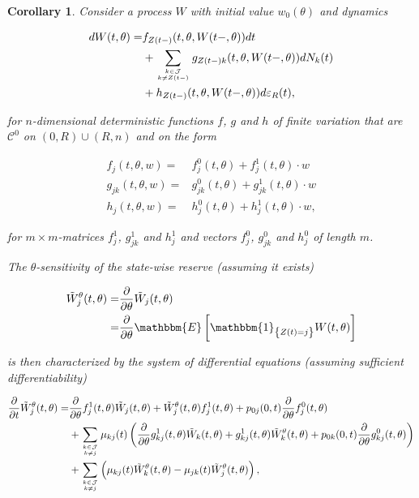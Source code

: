\documentclass{article}
\newcommand{\1}[1]{\mathbbm{1}_{\left\lbrace #1 \right\rbrace}}
\newcommand{\expec}[1][def]{\mathbbm{E} \left[ #1 \right]}
\theoremstyle{break}
\newtheorem{corollary}[definition]{Corollary}
\theoremstyle{remark}
\numberwithin{equation}{section}
\begin{document}
\begin{corollary} \label{Corollary}
	Consider a process $W$ with initial value $w_0(\theta)$ and dynamics
	
	\begin{align*}
		dW(t,\theta) =& f_{Z(t-)}(t,\theta,W(t-,\theta)) dt \\
		&+ \sum_{k \in \mathcal{J} \atop k \neq Z(t-)} g_{Z(t-)k}(t,\theta,W(t-,\theta)) dN_{k}(t) \\
		&+ h_{Z(t-)}(t,\theta,W(t-,\theta)) d \varepsilon_R(t),
	\end{align*}

	for $n$-dimensional deterministic functions $f$, $g$ and $h$ of finite variation that are $\mathcal{C}^0$ on $(0,R) \cup (R,n)$ and on the form
	
	\begin{align*}
		f_j(t,\theta,w) =& f_j^0(t,\theta) + f_j^1(t,\theta) \cdot w \\
		g_{jk}(t,\theta,w) =& g_{jk}^0(t,\theta) + g_{jk}^1(t,\theta) \cdot w \\
		h_j(t,\theta,w) =& h_j^0(t,\theta) + h_j^1(t,\theta) \cdot w,
	\end{align*}
	
	for $m \times m$-matrices $f_j^1$, $g_{jk}^1$ and $ h_j^1$ and vectors $f_j^0$, $g_{jk}^0$ and $ h_j^0$ of length $m$.

	The $\theta$-sensitivity of the state-wise reserve (assuming it exists)
	
	\begin{align*}
		\tilde{W}_j^\theta(t,\theta) =& \frac{\partial}{\partial \theta} \tilde{W}_j(t,\theta) \\
		=& \frac{\partial}{\partial \theta} \expec[\1{Z(t)=j} W(t,\theta)]
	\end{align*}
	
	is then characterized by the system of differential equations (assuming sufficient differentiability)
	
	\begin{align*}
		\frac{\partial}{\partial t} \tilde{W}_j^\theta(t,\theta) =& \frac{\partial}{\partial \theta} f_j^1(t,\theta) \tilde{W}_j(t,\theta) + \tilde{W}_j^\theta(t,\theta) f_j^1(t,\theta) + p_{0j}(0,t) \frac{\partial}{\partial \theta} f_j^0(t,\theta) \\
		&+ \sum_{k \in \mathcal{J} \atop k \neq j} \mu_{kj}(t) \left( \frac{\partial}{\partial \theta} g_{kj}^1(t,\theta) \tilde{W}_k(t,\theta) + g_{kj}^1(t,\theta) \tilde{W}_k^\theta(t,\theta) + p_{0k}(0,t) \frac{\partial}{\partial \theta} g_{kj}^0(t,\theta) \right) \\
		&+ \sum_{k \in \mathcal{J} \atop k \neq j} \left( \mu_{kj}(t) \tilde{W}_k^\theta(t,\theta) - \mu_{jk}(t) \tilde{W}_j^\theta(t,\theta) \right),
	\end{align*}
	

\end{corollary}
\end{document}
